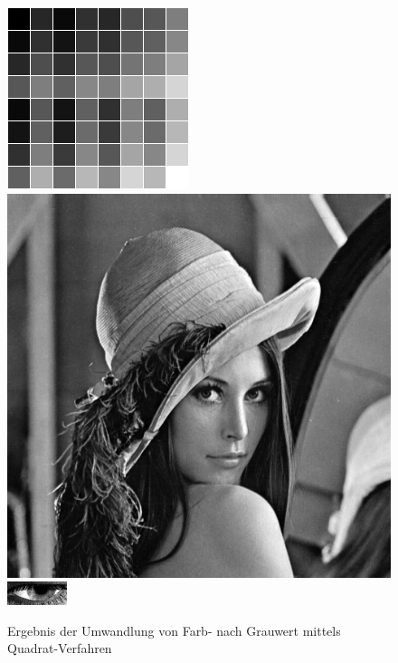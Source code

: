 \begin{figure}
	\centering
	\includegraphics[width=0.2\linewidth]{img/Farbkarte_Quadrat}
	\includegraphics[width=0.2\linewidth]{img/Lena_Quadrat}
	\includegraphics[width=0.2\linewidth]{img/Auge_QuadratGray}
	\caption{Ergebnis der Umwandlung von Farb- nach Grauwert mittels Quadrat-Verfahren}
	\label{img_Quadrat}
\end{figure}